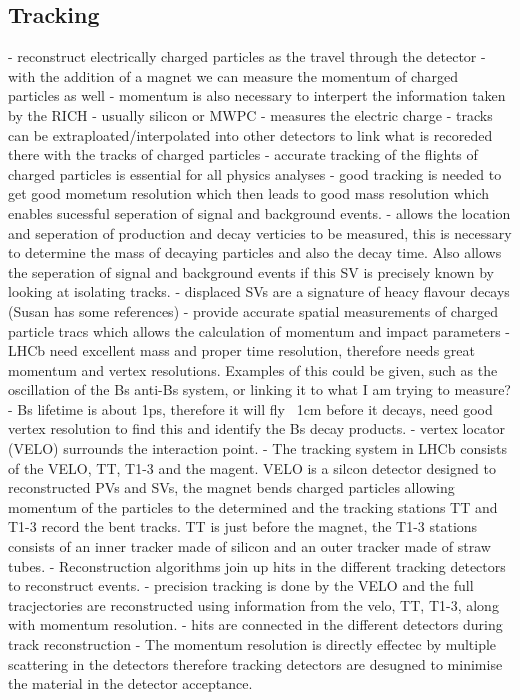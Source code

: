 \subsection{Tracking}
- reconstruct electrically charged particles as the travel through the detector
- with the addition of a magnet we can measure the momentum of charged particles as well
- momentum is also necessary to interpert the information taken by the RICH
- usually silicon or MWPC
- measures the electric charge
- tracks can be extraploated/interpolated into other detectors to link what is recoreded there with the tracks of charged particles
- accurate tracking of the flights of charged particles is essential for all physics analyses
- good tracking is needed to get good mometum resolution which then leads to good mass resolution which enables sucessful seperation of signal and background events. 
- allows the location and seperation of production and decay verticies to be measured, this is necessary to determine the mass of decaying particles and also the decay time. Also allows the seperation of signal and background events if this SV is precisely known by looking at isolating tracks.
- displaced SVs are a signature of heacy flavour decays (Susan has some references)
- provide accurate spatial measurements of charged particle tracs which allows the calculation of momentum and impact parameters
- LHCb need excellent mass and proper time resolution, therefore needs great momentum and vertex resolutions. Examples of this could be given, such as the oscillation of the Bs anti-Bs system, or linking it to what I am trying to measure?
- Bs lifetime is about 1ps, therefore it will fly ~1cm before it decays, need good vertex resolution to find this and identify the Bs decay products.
- vertex locator (VELO) surrounds the interaction point.
- The tracking system in LHCb consists of the VELO, TT, T1-3 and the magent. VELO is a silcon detector designed to reconstructed PVs and SVs, the magnet bends charged particles allowing momentum of the particles to the determined and the tracking stations TT and T1-3 record the bent tracks. TT is just before the magnet, the T1-3 stations consists of an inner tracker made of silicon and an outer tracker made of straw tubes.
- Reconstruction algorithms join up hits in the different tracking detectors to reconstruct events.
- precision tracking is done by the VELO and the full tracjectories are reconstructed using information from the velo, TT, T1-3, along with momentum resolution. 
- hits are connected in the different detectors during track reconstruction
- The momentum resolution is directly effectec by multiple scattering in the detectors therefore tracking detectors are desugned to minimise the material in the detector acceptance.



